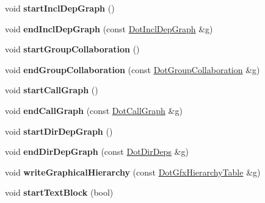 \begin{DoxyCompactItemize}
void {\bfseries start\+Incl\+Dep\+Graph} ()
\item 
\mbox{\label{class_html_generator_a5ea9e86d0086fed794d619899f4014d7}} 
void {\bfseries end\+Incl\+Dep\+Graph} (const \mbox{\hyperlink{class_dot_incl_dep_graph}{Dot\+Incl\+Dep\+Graph}} \&g)
\item 
\mbox{\label{class_html_generator_a0c2ea1971421f937a4bceaea76aba95a}} 
void {\bfseries start\+Group\+Collaboration} ()
\item 
\mbox{\label{class_html_generator_a9c522d8f611e8008f413d1887ee31d4a}} 
void {\bfseries end\+Group\+Collaboration} (const \mbox{\hyperlink{class_dot_group_collaboration}{Dot\+Group\+Collaboration}} \&g)
\item 
\mbox{\label{class_html_generator_ad02b96924b42a2f2ac3e511dbbb587c2}} 
void {\bfseries start\+Call\+Graph} ()
\item 
\mbox{\label{class_html_generator_a7a304cc5507fac3e1501a5d442c70157}} 
void {\bfseries end\+Call\+Graph} (const \mbox{\hyperlink{class_dot_call_graph}{Dot\+Call\+Graph}} \&g)
\item 
\mbox{\label{class_html_generator_ae98ba8c8ff63e688bc33af4114507335}} 
void {\bfseries start\+Dir\+Dep\+Graph} ()
\item 
\mbox{\label{class_html_generator_a6b8ce5266f910a0bec4fc48a41c35f49}} 
void {\bfseries end\+Dir\+Dep\+Graph} (const \mbox{\hyperlink{class_dot_dir_deps}{Dot\+Dir\+Deps}} \&g)
\item 
\mbox{\label{class_html_generator_aa3618ecfc5f53f11a7f26bd4bb6d432f}} 
void {\bfseries write\+Graphical\+Hierarchy} (const \mbox{\hyperlink{class_dot_gfx_hierarchy_table}{Dot\+Gfx\+Hierarchy\+Table}} \&g)
\item 
\mbox{\label{class_html_generator_ad3b0577be9211daec92334e0969b7530}} 
void {\bfseries start\+Text\+Block} (bool)
\item 
\mbox{\label{class_html_generator_a10c142119a0926773b499872108305db}} 

\end{DoxyCompactItemize}
